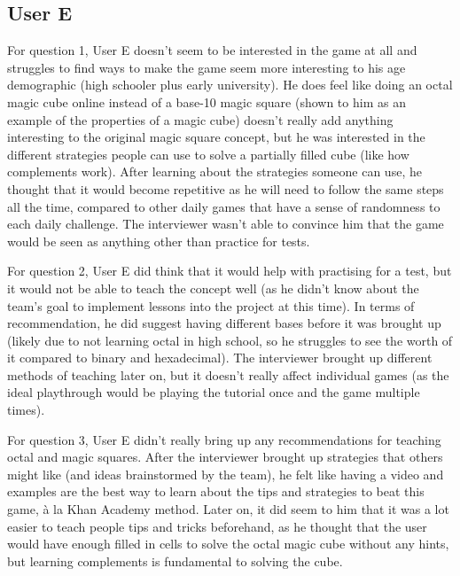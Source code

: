 \documentclass{article}
\begin{document}
\subsection{User E}


For question 1, User E doesn't seem to be interested in the game at all and struggles to find ways to make the game seem more interesting to his age demographic (high schooler plus early university). He does feel like doing an octal magic cube online instead of a base-10 magic square (shown to him as an example of the properties of a magic cube) doesn't really add anything interesting to the original magic square concept, but he was interested in the different strategies people can use to solve a partially filled cube (like how complements work). After learning about the strategies someone can use, he thought that it would become repetitive as he will need to follow the same steps all the time, compared to other daily games that have a sense of randomness to each daily challenge. The interviewer wasn't able to convince him that the game would be seen as anything other than practice for tests.

For question 2, User E did think that it would help with practising for a test, but it would not be able to teach the concept well (as he didn't know about the team's goal to implement lessons into the project at this time). In terms of recommendation, he did suggest having different bases before it was brought up (likely due to not learning octal in high school, so he struggles to see the worth of it compared to binary and hexadecimal). The interviewer brought up different methods of teaching later on, but it doesn't really affect individual games (as the ideal playthrough would be playing the tutorial once and the game multiple times).

For question 3, User E didn't really bring up any recommendations for teaching octal and magic squares. After the interviewer brought up strategies that others might like (and ideas brainstormed by the team), he felt like having a video and examples are the best way to learn about the tips and strategies to beat this game, \`a la Khan Academy method. Later on, it did seem to him that it was a lot easier to teach people tips and tricks beforehand, as he thought that the user would have enough filled in cells to solve the octal magic cube without any hints, but learning complements is fundamental to solving the cube. 
\end{document}
